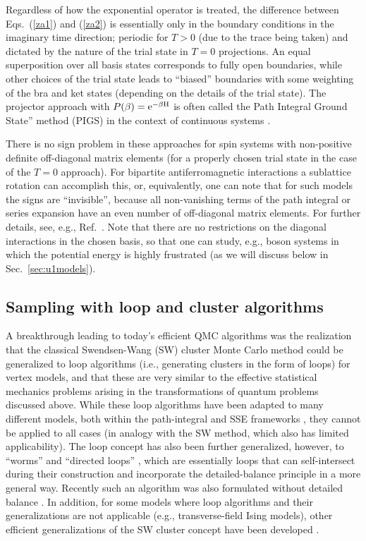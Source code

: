 \documentclass[range]{ar2e}
\begin{document}
Regardless of how the exponential operator is treated, the difference between Eqs.~(\ref{za1}) and (\ref{za2}) is essentially only in the boundary 
conditions in the imaginary time direction; periodic for $T>0$ (due to the trace being taken) and dictated by the nature of the trial state in $T=0$ 
projections. An equal superposition over all basis states corresponds to fully open boundaries, while other choices of the trial state leads to ``biased''
boundaries with some weighting of the bra and ket states (depending on the details of the trial state). The projector approach with $P(\beta)={\rm e^{-\beta H}}$
is often called the Path Integral Ground State'' method (PIGS) in the context of continuous systems \cite{Sarsa00,Vitali08}.

There is no sign problem in these approaches for spin systems with non-positive definite off-diagonal matrix elements (for a properly chosen trial state in the 
case of the $T=0$ approach). For bipartite antiferromagnetic interactions a sublattice rotation can accomplish this, or, equivalently, one can note that
for such models the signs are ``invisible'', because all non-vanishing terms of the path integral or series expansion have an even number of off-diagonal 
matrix elements. For further details, see, e.g., Ref.~\cite{Henelius00}. Note that there are no restrictions on the diagonal interactions in the chosen 
basis, so that one can study, e.g., boson systems in which the potential energy is highly frustrated (as we will discuss below in Sec.~\ref{sec:u1models}).


\subsection{Sampling with loop and cluster algorithms}

A breakthrough leading to today's efficient QMC algorithms was the realization \cite{Evertz93} that the classical Swendsen-Wang (SW) cluster 
Monte Carlo method \cite{Swendsen88} could be generalized to loop algorithms (i.e., generating clusters in the form of loops) for vertex models, and that 
these are very similar to the effective statistical mechanics problems arising in the transformations of quantum problems discussed above. While these
loop algorithms have been adapted to many different models, both within the path-integral and SSE frameworks \cite{Kawashima94,Beard96,Sandvik99,Evertz03}, 
they cannot be applied to all cases (in analogy with the SW method, which also has limited applicability). The loop concept has also been further generalized, 
however, to ``worms'' \cite{Prokofev96,Prokofev98, WormA} and ``directed loops'' \cite{Sandvik99,Syljuasen02}, which are essentially loops that can self-intersect 
during their construction and incorporate the detailed-balance principle in a more general way. Recently such 
an algorithm was also formulated without detailed balance \cite{Suwa10}. In addition, for some models where loop algorithms and their generalizations are not 
applicable (e.g., transverse-field Ising models), other efficient generalizations of the SW cluster concept have been developed \cite{Rieger99,Sandvik03}.
\end{document}
